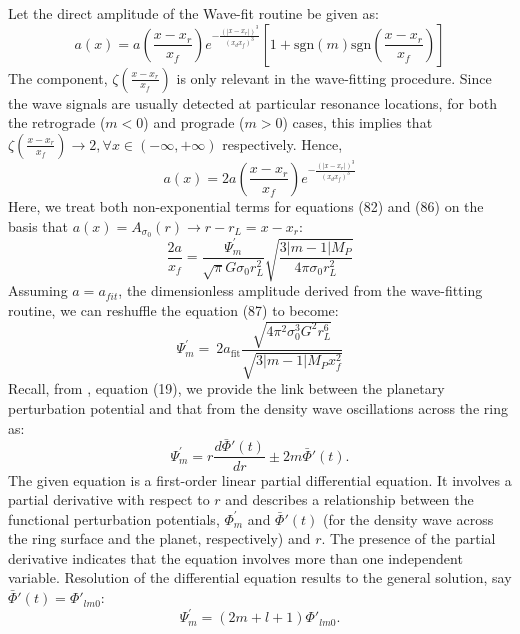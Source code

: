 \documentclass[conference]{IEEEtran}
\begin{document}
Let the direct amplitude of the Wave-fit routine be given as:
\begin{equation} 
a(x) = a(\frac{x-x_{r}}{x_{f}})e^{-\frac{(|x-x_{r}|)^{3}}{(x_{d}x_{f})^{3}}}[1 + \mathrm{sgn}(m) \mathrm{sgn}(\frac{x-x_{r}}{x_{f}})]
\end{equation}
The component, $\zeta(\frac{x-x_{r}}{x_{f}})$ is only relevant in the wave-fitting procedure. Since the wave signals are usually detected at particular resonance locations, for both the retrograde ($m<0$) and prograde ($m>0$) cases, this implies that $\zeta(\frac{x-x_{r}}{x_{f}}) \rightarrow 2, \forall x \in (-\infty,+\infty)$ respectively.
Hence,
\begin{equation} 
a(x) = 2a(\frac{x-x_{r}}{x_{f}})e^{-\frac{(|x-x_{r}|)^{3}}{(x_{d}x_{f})^{3}}}
\end{equation}
Here, we treat both non-exponential terms for equations (82) and (86) on the basis that $a(x) = A_{\sigma_{0}}(r) \rightarrow r-r_{L} = x-x_{r}$:
\begin{equation}
\frac{2a}{x_{f}} = \frac{\Psi^{'}_{m}}{\sqrt{\pi} G\sigma_{0}r_{L}^{2}}\sqrt{\frac{3|m-1|M_{P}}{4\pi\sigma_{0}r_{L}^{2}}}
\end{equation}
Assuming $a = a_{fit}$, the dimensionless amplitude derived from the wave-fitting routine, we can reshuffle the equation (87) to become:
\begin{equation}
\Psi^{'}_{m} = \ 2a_{\text{fit}} \frac{\sqrt{4\pi^{2}\sigma_{0}^{3}G^{2}r_{L}^{6}}}{\sqrt{3|m-1|M_{P} x_{f}^{2}}}
\end{equation}
Recall, from \cite{Marley1993PlanetaryAM}, equation (19), we provide the link between the planetary perturbation potential and that from the density wave oscillations across the ring as:
\begin{equation}
\Psi^{'}_{m} = r \frac{d \bar{\Phi}{'}(t)}{dr} \pm 2m\bar{\Phi}{'}(t).
\end{equation}
The given equation is a first-order linear partial differential equation. It involves a partial derivative with respect to $r$ and describes a relationship between the functional perturbation potentials, $\Phi^{'}_{m}$ and $\bar{\Phi}{'}(t)$ (for the density wave across the ring surface and the planet, respectively) and $r$. The presence of the partial derivative indicates that the equation involves more than one independent variable. Resolution of the differential equation results to the general solution, say $\bar{\Phi}{'}(t) = \Phi{'}_{lm0}$:
\begin{equation}
\Psi^{'}_{m} = (2m +l+1)\Phi{'}_{lm0}.
\end{equation}
\end{document}
